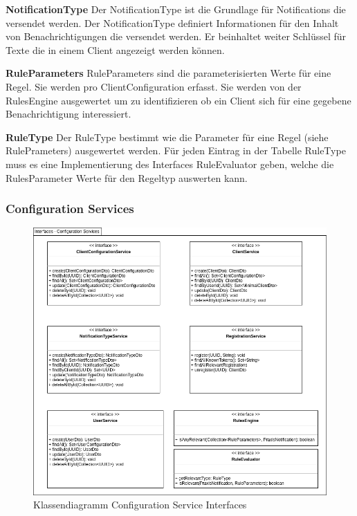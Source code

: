 \textbf{NotificationType}
Der NotificationType ist die Grundlage für Notifications die versendet werden.
Der NotificationType definiert Informationen für den Inhalt von Benachrichtigungen die versendet werden.
Er beinhaltet weiter Schlüssel für Texte die in einem Client angezeigt werden können.

\textbf{RuleParameters}
RuleParameters sind die parameterisierten Werte für eine Regel.
Sie werden pro ClientConfiguration erfasst.
Sie werden von der RulesEngine ausgewertet um zu identifizieren ob ein Client sich für eine gegebene Benachrichtigung interessiert.

\textbf{RuleType}
Der RuleType bestimmt wie die Parameter für eine Regel (siehe RulePrameters) ausgewertet werden.
Für jeden Eintrag in der Tabelle RuleType muss es eine Implementierung des Interfaces RuleEvaluator geben, welche die RulesParameter Werte für den Regeltyp auswerten kann.

\subsubsection*{Configuration Services}

\begin{figure}[h]
    \centering
    \begin{minipage}[b]{0.9\textwidth}
        \includegraphics[width=\textwidth]{graphics/Class_Configuration_Services}
        \caption{Klassendiagramm Configuration Service Interfaces}
    \end{minipage}
\end{figure}

